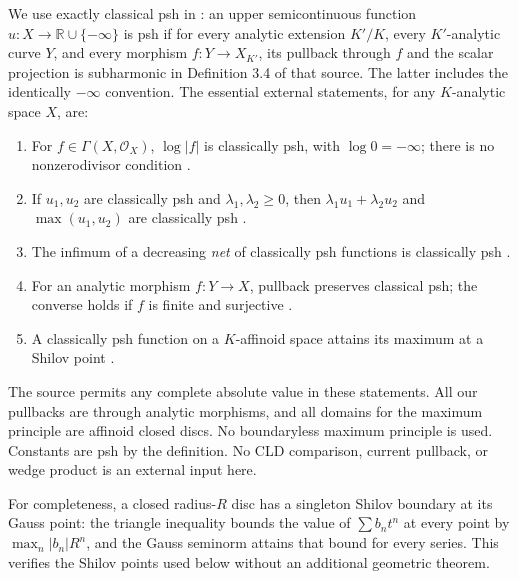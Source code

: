 \documentclass[11pt]{article}
\theoremstyle{definition}
\begin{document}
We use exactly classical psh in \cite[Definition 4.1]{GR}: an upper
semicontinuous function $u:X\to\mathbb R\cup\{-\infty\}$ is psh if
for every analytic extension $K'/K$, every $K'$-analytic curve $Y$, and
every morphism $f:Y\to X_{K'}$, its pullback through $f$ and the scalar
projection is subharmonic in Definition 3.4 of that source. The latter
includes the identically $-\infty$ convention. The essential external
statements, for any $K$-analytic space $X$, are:
\begin{enumerate}
\item For $f\in\Gamma(X,\mathcal O_X)$, $\log|f|$ is classically psh,
with $\log0=-\infty$; there is no nonzerodivisor condition
\cite[Proposition 4.2(2)]{GR}.
\item If $u_1,u_2$ are classically psh and $\lambda_1,\lambda_2\geq0$,
then $\lambda_1u_1+\lambda_2u_2$ and $\max(u_1,u_2)$ are classically
psh \cite[Proposition 4.2(3)]{GR}.
\item The infimum of a decreasing \emph{net} of classically psh functions
is classically psh \cite[Proposition 4.2(4)]{GR}.
\item For an analytic morphism $f:Y\to X$, pullback preserves classical
psh; the converse holds if $f$ is finite and surjective
\cite[Proposition 4.2(6)]{GR}.
\item A classically psh function on a $K$-affinoid space attains its
maximum at a Shilov point \cite[Theorem 6.4]{GR}.
\end{enumerate}
The source permits any complete absolute value in these statements.
All our pullbacks are through analytic morphisms, and all domains for
the maximum principle are affinoid closed discs. No boundaryless
maximum principle is used. Constants are psh by the definition. No CLD
comparison, current pullback, or wedge product is an external input here.

For completeness, a closed radius-$R$ disc has a singleton Shilov boundary
at its Gauss point: the triangle inequality bounds the value of
$\sum b_nt^n$ at every point by $\max_n|b_n|R^n$, and the Gauss seminorm
attains that bound for every series. This verifies the Shilov points used
below without an additional geometric theorem.
\end{document}

